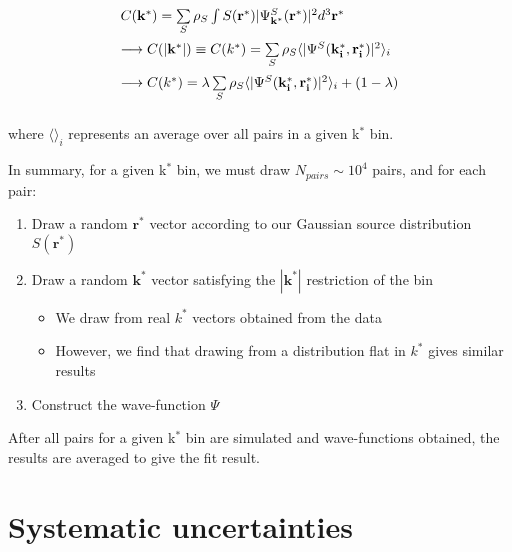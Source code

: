 \documentclass[ALICE,manyauthors]{cernphprep}
\begin{document}
\begin{equation}
\begin{array}{l}
\vspace{2mm}
  C(\mathbf{k^{*}}) = \sum\limits_{S}\rho_{S}\int S(\mathbf{r^{*}})|\Psi^{S}_{\mathbf{k^{*}}}(\mathbf{r^{*}})|^{2}d^{3}\mathbf{r^{*}} \\
\vspace{2mm}
  \longrightarrow C(|\mathbf{k^{*}}|) \equiv C(k^{*}) = \sum\limits_{S}\rho_{S}\langle |\Psi^{S}(\mathbf{k^{*}_{i}},\mathbf{r^{*}_{i}})|^{2} \rangle_{i} \\
\vspace{2mm}
  \longrightarrow C(k^{*}) = \lambda\sum\limits_{S}\rho_{S}\langle |\Psi^{S}(\mathbf{k^{*}_{i}},\mathbf{r^{*}_{i}})|^{2} \rangle_{i} + (1-\lambda)

\end{array}
\label{eqn:CoulombEqn2}
\end{equation}

where $\langle \rangle_{i}$ represents an average over all pairs in a given k$^{*}$ bin.

In summary, for a given k$^{*}$ bin, we must draw $N_{pairs} \sim 10^{4}$ pairs, and for each pair:

\begin{enumerate}
 \item Draw a random $\mathbf{r}^{*}$ vector according to our Gaussian source distribution $S(\mathbf{r}^{*})$
 \item Draw a random $\mathbf{k}^{*}$ vector satisfying the $|\mathbf{k}^{*}|$ restriction of the bin
 \begin{itemize}
  \item We draw from real $k^{*}$ vectors obtained from the data
  \item However, we find that drawing from a distribution flat in $k^{*}$ gives similar results
 \end{itemize}
 \item Construct the wave-function $\Psi$
\end{enumerate}

After all pairs for a given k$^{*}$ bin are simulated and wave-functions obtained, the results are averaged to give the fit result.



\section{Systematic uncertainties}
\label{sec:SysErrs}
\end{document}

